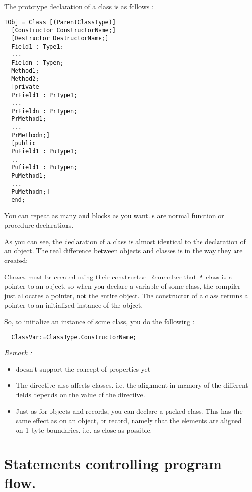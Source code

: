 \documentclass{report}
\begin{document}
The prototype declaration of a class is as follows :
\begin{verbatim}
TObj = Class [(ParentClassType)]
  [Constructor ConstructorName;]
  [Destructor DestructorName;]
  Field1 : Type1;
  ...
  Fieldn : Typen;
  Method1;
  Method2;
  [private
  PrField1 : PrType1;
  ...
  PrFieldn : PrTypen;
  PrMethod1;
  ...
  PrMethodn;]
  [public
  PuField1 : PuType1;
  ..
  Pufield1 : PuTypen;
  PuMethod1;
  ...
  PuMethodn;]
  end;
\end{verbatim}
You can repeat as many  and  blocks as you want.
s are normal function or procedure declarations. 

As you can see, the declaration of a class is almost identical to the
declaration of an object. The real difference between objects and classes
is in the way they are created;

Classes must be created using their constructor. Remember that A class is a
pointer to an object, so when you declare a variable of some class, the
compiler just allocates a pointer, not the entire object. The constructor of
a class returns a pointer to an initialized instance of the object.

So, to initialize an instance of some class, you do the following :
\begin{verbatim}
  ClassVar:=ClassType.ConstructorName;
\end{verbatim}

{\em Remark :}
\begin{itemize}
\item \fpc doesn't support the concept of properties yet.
\item The  directive also affects classes.
i.e. the alignment in memory of the different fields depends on the
value of  the  directive.
\item Just as for objects and records, you can declare a packed class.
This has the same effect as on an object, or record, namely that the
elements are aligned on 1-byte boundaries. i.e. as close as possible.
\end{itemize}

\section{Statements controlling program flow.}
\end{document}
